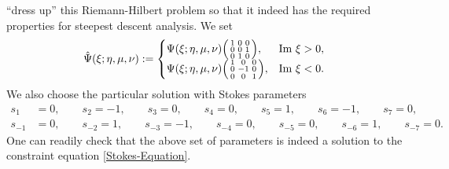 \documentclass[usenames,dvipsnames]{article}
\theoremstyle{definition}
\numberwithin{equation}{section}
\numberwithin{figure}{section}
\begin{document}
``dress up'' this Riemann-Hilbert problem so that it indeed has the required properties for steepest descent analysis. We set
    \begin{equation}
        \hat{\Psi}(\xi;\eta,\mu,\nu) := 
            \begin{cases}
                \Psi(\xi;\eta,\mu,\nu)
                    \begin{psmallmatrix}
                        1 & 0 & 0\\
                        0 & 0 & 1\\
                        0 & 1 & 0
                    \end{psmallmatrix}, & \text{Im } \xi > 0,\\
                \Psi(\xi;\eta,\mu,\nu)\begin{psmallmatrix}
                        1 & 0 & 0\\
                        0 &-1 & 0\\
                        0 & 0 & 1
                    \end{psmallmatrix}, & \text{Im } \xi < 0.
            \end{cases}
    \end{equation}
We also choose the particular solution with Stokes parameters
    \begin{align}
        s_1 &= 0,\qquad s_2 = -1,\qquad s_3 = 0,\qquad s_4 = 0,\qquad s_5 = 1,\qquad s_6 = -1, \qquad s_7 = 0,\nonumber\\
        s_{-1} &= 0,\qquad s_{-2} = 1,\qquad s_{-3} = -1,\qquad s_{-4} = 0,\qquad s_{-5} = 0,\qquad s_{-6} = 1,\qquad s_{-7} = 0.
    \end{align}
One can readily check that the above set of parameters is indeed a solution to the constraint equation \eqref{Stokes-Equation}.
\end{document}
